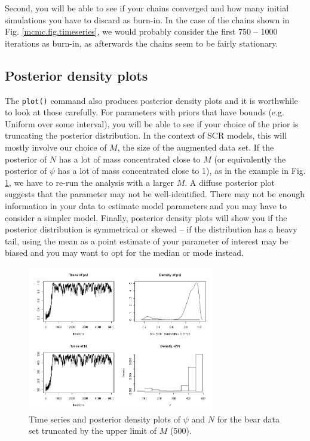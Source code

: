 Second, you will be able to see if your chains converged and how many initial simulations you have to discard as burn-in. In the case of the chains shown in Fig. \ref{mcmc.fig.timeseries}, we would probably consider the first 750 -- 1000 iterations as burn-in, as afterwards the chains seem to be fairly stationary.

\subsection{Posterior density plots}
The \verb#plot()# command also produces posterior density plots and it is worthwhile to look at those carefully. For parameters with priors that have bounds (e.g. Uniform over some interval), you will be able to see if your choice of the prior is truncating the posterior distribution. In the context of SCR models, this will mostly involve our choice of $M$, the size of the augmented data set. If the posterior of $N$ has a lot of mass concentrated close to $M$ (or equivalently the posterior of $\psi$ has a lot of mass concentrated close to 1), as in the example in Fig. \ref{timeseries2.fig}, we have to re-run the analysis with a larger $M$.  A diffuse
posterior plot suggests
that the parameter may not be well-identified. 
There may not be enough information in your data to estimate model parameters and you may have to consider a simpler model. Finally, posterior density plots will show you if the posterior distribution is symmetrical or skewed -- if the distribution has a heavy tail, using the mean as a point estimate of your parameter of interest may be biased and you may want to opt for the median or mode instead.

\begin{figure}
\begin{center}
\includegraphics[height=2.5in]{Ch7/figs/timeseries2}
\end{center}
\caption{Time series and posterior density plots of $\psi$ and $N$ for the bear data set truncated by the upper limit of $M$ (500).}
\label{timeseries2.fig}
\end{figure}

